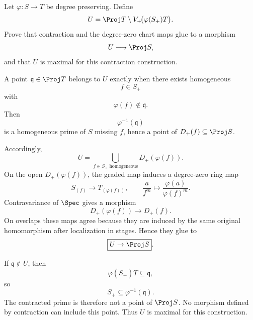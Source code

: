 \begin{problem}\label{prob:vi35-20}
Let \(\varphi:S\to T\) be degree preserving. Define
\[
U=\Proj T\setminus V_+\!\bigl(\varphi(S_+)T\bigr).
\]
Prove that contraction and the degree-zero chart maps glue to a morphism
\[
U\longrightarrow\Proj S,
\]
and that \(U\) is maximal for this contraction construction.

\end{problem}

\ifdefined\FullProblemDossiers
\begin{solution}
A point \(\mathfrak q\in\Proj T\) belongs to \(U\) exactly when there exists homogeneous
\[
f\in S_+
\]
with
\[
\varphi(f)\notin\mathfrak q.
\]
Then
\[
\varphi^{-1}(\mathfrak q)
\]
is a homogeneous prime of \(S\) missing \(f\), hence a point of \(D_+(f)\subseteq\Proj S\).

Accordingly,
\[
U
=
\bigcup_{f\in S_+\text{ homogeneous}}D_+(\varphi(f)).
\]
On the open \(D_+(\varphi(f))\), the graded map induces a degree-zero ring map
\[
S_{(f)}
\longrightarrow
T_{(\varphi(f))},
\qquad
\frac a{f^m}\longmapsto
\frac{\varphi(a)}{\varphi(f)^m}.
\]
Contravariance of \(\Spec\) gives a morphism
\[
D_+(\varphi(f))
\longrightarrow
D_+(f).
\]
On overlaps these maps agree because they are induced by the same original homomorphism after localization in
stages. Hence they glue to
\[
\boxed{U\to\Proj S}.
\]

If \(\mathfrak q\notin U\), then
\[
\varphi(S_+)T\subseteq\mathfrak q,
\]
so
\[
S_+\subseteq\varphi^{-1}(\mathfrak q).
\]
The contracted prime is therefore not a point of \(\Proj S\). No morphism defined by contraction can include this
point. Thus \(U\) is maximal for this construction.
\end{solution}
\fi

